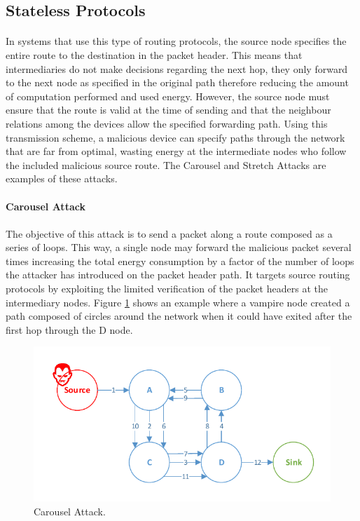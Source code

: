 \subsection{Stateless Protocols}
\label{sec:source_routing}
\paragraph{}
In systems that use this type of routing protocols, the source node specifies the entire route to the destination in the packet header. This means that intermediaries do not make decisions regarding the next hop, they only forward to the next node as specified in the original path therefore reducing the amount of computation performed and used energy. However, the source node must ensure that the route is valid at the time of sending and that the neighbour relations among the devices allow the specified forwarding path. Using this transmission scheme, a malicious device can specify paths through the network that are far from optimal, wasting energy at the intermediate nodes who follow the included malicious source route. The Carousel and Stretch Attacks are examples of these attacks.

\paragraph{\textbf{Carousel Attack}}
\paragraph{}
The objective of this attack is to send a packet along a route composed as a series of loops. This way, a single node may forward the malicious packet several times increasing the total energy consumption by a factor of the number of loops the attacker has introduced on the packet header path. It targets source routing protocols by exploiting the limited verification of the packet headers at the intermediary nodes. Figure \ref{fig:carousel_attack} shows an example where a vampire node created a path composed of circles around the network when it could have exited after the first hop through the D node.
 
\begin{figure}[h]
  \centering
  \includegraphics[width=0.9\linewidth]{figures/Carousel_Attack.pdf}
  \caption{Carousel Attack.}
  \label{fig:carousel_attack}
\end{figure}


